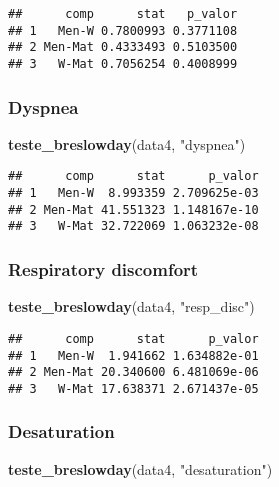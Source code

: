 \documentclass[
]{article}
\newenvironment{Shaded}{\begin{snugshade}}{\end{snugshade}}
\newcommand{\KeywordTok}[1]{\textcolor[rgb]{0.13,0.29,0.53}{\textbf{#1}}}
\newcommand{\NormalTok}[1]{#1}
\newcommand{\StringTok}[1]{\textcolor[rgb]{0.31,0.60,0.02}{#1}}
\begin{document}
\begin{verbatim}
##      comp      stat   p_valor
## 1   Men-W 0.7800993 0.3771108
## 2 Men-Mat 0.4333493 0.5103500
## 3   W-Mat 0.7056254 0.4008999
\end{verbatim}

\hypertarget{dyspnea-3}{%
\subsubsection{Dyspnea}\label{dyspnea-3}}

\begin{Shaded}
\begin{Highlighting}[]
\KeywordTok{teste_breslowday}\NormalTok{(data4, }\StringTok{"dyspnea"}\NormalTok{)}
\end{Highlighting}
\end{Shaded}

\begin{verbatim}
##      comp      stat      p_valor
## 1   Men-W  8.993359 2.709625e-03
## 2 Men-Mat 41.551323 1.148167e-10
## 3   W-Mat 32.722069 1.063232e-08
\end{verbatim}

\hypertarget{respiratory-discomfort-3}{%
\subsubsection{Respiratory discomfort}\label{respiratory-discomfort-3}}

\begin{Shaded}
\begin{Highlighting}[]
\KeywordTok{teste_breslowday}\NormalTok{(data4, }\StringTok{"resp_disc"}\NormalTok{)}
\end{Highlighting}
\end{Shaded}

\begin{verbatim}
##      comp      stat      p_valor
## 1   Men-W  1.941662 1.634882e-01
## 2 Men-Mat 20.340600 6.481069e-06
## 3   W-Mat 17.638371 2.671437e-05
\end{verbatim}

\hypertarget{desaturation-3}{%
\subsubsection{Desaturation}\label{desaturation-3}}

\begin{Shaded}
\begin{Highlighting}[]
\KeywordTok{teste_breslowday}\NormalTok{(data4, }\StringTok{"desaturation"}\NormalTok{)}
\end{Highlighting}
\end{Shaded}
\end{document}
